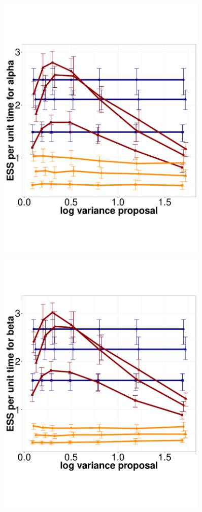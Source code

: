   \begin{figure}%
  \centering
  \begin{minipage}[hp]{0.45\linewidth}
  \centering
    \includegraphics [width=0.90\textwidth, angle=0]{figs/q_5_alpha.pdf}
      \end{minipage}
  \begin{minipage}[hp]{0.45\linewidth}
  \centering
    \includegraphics [width=0.90\textwidth, angle=0]{figs/q_5_beta.pdf}

\end{minipage}
\end{figure}
